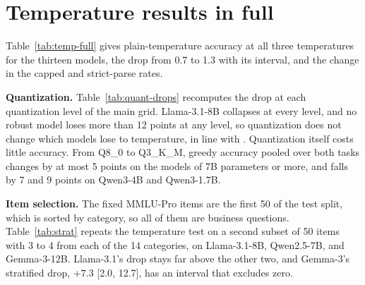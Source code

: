 \documentclass[11pt]{article}
\begin{document}
\begin{table}[t]\centering
\caption{Parse outcomes under plain temperature sampling at Q8\_0 (\% of generations,
rounded): strict, flexible, failed, and capped (capped overlaps the other three).}
\label{tab:decomp}
\scriptsize\renewcommand{\arraystretch}{0.95}\setlength{\tabcolsep}{5pt}
\end{table}

\begin{table}[t]\centering
\caption{Accuracy among strict-parsed generations under plain temperature sampling at Q8\_0,
with the share of generations that parse strictly, the number $n$ of such generations at
$T{=}1.3$ (of 150), and greedy accuracy on their items with each surviving generation counted
once. Point estimates without intervals.}
\label{tab:survivor}
\scriptsize\renewcommand{\arraystretch}{0.95}\setlength{\tabcolsep}{4pt}
\end{table}


\section{Temperature results in full}
\label{app:temp}

Table~\ref{tab:temp-full} gives plain-temperature accuracy at all three temperatures for the
thirteen models, the drop from 0.7 to 1.3 with its interval, and the change in the capped and
strict-parse rates.

\textbf{Quantization.} Table~\ref{tab:quant-drops} recomputes the drop at each quantization
level of the main grid. Llama-3.1-8B collapses at every level, and no robust model loses more
than 12 points at any level, so quantization does not change which models lose to temperature,
in line with \citet{prasad2026quantization}. Quantization itself costs little accuracy. From
Q8\_0 to Q3\_K\_M, greedy accuracy pooled over both tasks changes by
at most 5 points on the models of 7B parameters or more, and falls by 7 and 9 points on Qwen3-4B
and Qwen3-1.7B.

\textbf{Item selection.} The fixed MMLU-Pro items are the first 50 of the test split, which is
sorted by category, so all of them are business questions. Table~\ref{tab:strat} repeats the
temperature test on a second subset of 50 items with 3 to 4 from each of the 14 categories, on
Llama-3.1-8B, Qwen2.5-7B, and Gemma-3-12B. Llama-3.1's drop stays far above the other two, and
Gemma-3's stratified drop, $+7.3$ [2.0, 12.7], has an interval that excludes zero.
\end{document}
